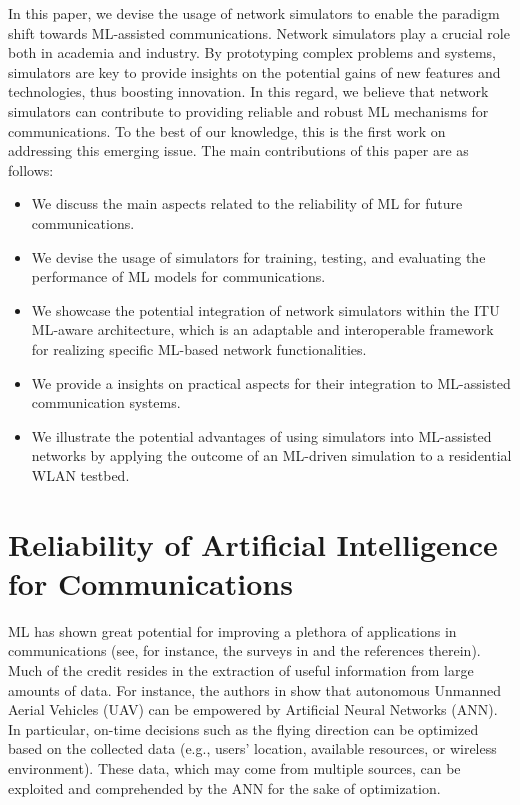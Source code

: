 \documentclass{article}
\begin{document}
	In this paper, we devise the usage of network simulators to enable the paradigm shift towards ML-assisted communications. Network simulators play a crucial role both in academia and industry. By prototyping complex problems and systems, simulators are key to provide insights on the potential gains of new features and technologies, thus boosting innovation. In this regard, we believe that network simulators can contribute to providing reliable and robust ML mechanisms for communications. To the best of our knowledge, this is the first work on addressing this emerging issue. The main contributions of this paper are as follows:
	\begin{itemize}
		\item We discuss the main aspects related to the reliability of ML for future communications.
		\item We devise the usage of simulators for training, testing, and evaluating the performance of ML models for communications.
		\item We showcase the potential integration of network simulators within the ITU ML-aware architecture, which is an adaptable and interoperable framework for realizing specific ML-based network functionalities.
		\item We provide a insights on practical aspects for their integration to ML-assisted communication systems. 
		\item We illustrate the potential advantages of using simulators into ML-assisted networks by applying the outcome of an ML-driven simulation to a residential WLAN testbed.
	\end{itemize}
		
	\section{Reliability of Artificial Intelligence for Communications}
	
	ML has shown great potential for improving a plethora of applications in communications (see, for instance, the surveys in \cite{survey2,survey3,survey4,survey5,survey6} and the references therein). Much of the credit resides in the extraction of useful information from large amounts of data. For instance, the authors in \cite{survey4} show that autonomous Unmanned Aerial Vehicles (UAV) can be empowered by Artificial Neural Networks (ANN). In particular, on-time decisions such as the flying direction can be optimized based on the collected data (e.g., users' location, available resources, or wireless environment). These data, which may come from multiple sources, can be exploited and comprehended by the ANN for the sake of optimization.
	
\end{document}
